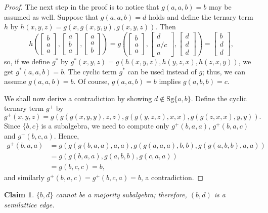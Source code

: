\documentclass[11pt]{amsart}
\theoremstyle{definition}
\theoremstyle{remark}
\theoremstyle{plain}
\newtheorem{claim}[thm]{Claim}
\begin{document}
\begin{enumerate}[wide, labelindent=0pt]
\begin{proof}
The next step in the proof is to notice that $g(a,a,b)=b$ may be assumed as well. Suppose that $g(a,a,b)=d$ holds and define the ternary term $h$ by $h(x,y,z)=g(x,g(x,y,y),g(x,y,z))$. Then 
$$
h\left(
\begin{bmatrix}
b \\
a \\
a
\end{bmatrix}\!,\!
\begin{bmatrix}
a \\
b \\
a
\end{bmatrix}\!,\!
\begin{bmatrix}
a \\
a \\
b
\end{bmatrix}
\right)=g\left(
\begin{bmatrix}
b \\
a \\
a
\end{bmatrix}\!,\!
\begin{bmatrix}
d \\
a/c \\
a
\end{bmatrix}\!,\!
\begin{bmatrix}
d \\
d \\
d
\end{bmatrix}
\right)=
\begin{bmatrix}
b \\
d \\
d
\end{bmatrix},
$$ so, if we define $g^*$ by $g^*(x,y,z)=g(h(x,y,z),h(y,z,x),h(z,x,y))$, we get $g^*(a,a,b)=b$. The cyclic term $g^*$ can be used instead of $g$; thus, we can assume $g(a,a,b)=b$. Of course, $g(a,a,b)=b$ implies $g(a,b,b)=c$.

We shall now derive a contradiction by showing $d\notin\mathrm{Sg}\{a,b\}$. Define the cyclic ternary term $g^+$ by $$g^+(x,y,z)=g(g(g(x,y,y),z,z),g(g(y,z,z),x,x),g(g(z,x,x),y,y)).$$ Since $\{b,c\}$ is a subalgebra, we need to compute only $g^+(b,a,a)$, $g^+(b,a,c)$ and $g^+(b,c,a)$. Hence,
\begin{align*}
   g^+(b,a,a)&=g(g(g(b,a,a),a,a),g(g(a,a,a),b,b),g(g(a,b,b),a,a))\\
            &=g(g(b,a,a),g(a,b,b),g(c,a,a))\\
            &=g(b,c,c)=b,
\end{align*}
and similarly $g^+(b,a,c)=g^+(b,c,a)=b$, a contradiction.
\end{proof}
\begin{claim}
$\{b,d\}$ cannot be a majority subalgebra; therefore, $(b,d)$ is a semilattice edge.
\end{claim}


\end{enumerate}
\end{document}
